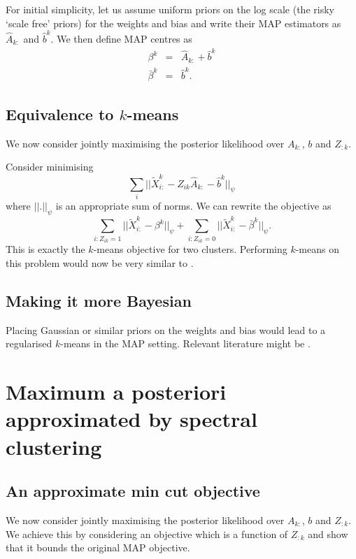 \documentclass{article}
\numberwithin{equation}{section}
\numberwithin{thm}{section}
\def\IBP{Z}
\def\Weights{A}
\def\Residuals{\tilde{X}}
\def\bias{b}
\def\centre{\beta}
\begin{document}
For initial simplicity, let us assume uniform priors on the log scale (\ie the risky `scale free' priors) for the weights and bias and write their MAP estimators as $\hat{\Weights}_{k:}$ and $\hat{\bias}^k$. We then define MAP centres as
\begin{eqnarray}
\centre^k & = & \hat{\Weights}_{k:} + \hat{\bias}^k \\
\bar{\centre}^k & = & \hat{\bias}^k.
\end{eqnarray}

\subsection{Equivalence to $k$-means}

We now consider jointly maximising the posterior likelihood over $\Weights_{k:}$, $\bias$ and $\IBP_{:k}$.

Consider minimising
\begin{equation}
\sum_i||\Residuals^k_{i:} - \IBP_{ik}\hat{\Weights}_{k:} - \hat{\bias}^k||_\psi
\end{equation}
where $||.||_\psi$ is an appropriate sum of norms. We can rewrite the objective as
\begin{equation}
\sum_{i: \IBP_{ik} = 1}||\Residuals^k_{i:} - \centre^k||_\psi + \sum_{i: \IBP_{ik} = 0}||\Residuals^k_{i:} - \bar{\centre}^k||_\psi.
\end{equation}
This is exactly the $k$-means objective for two clusters.
Performing $k$-means on this problem would now be very similar to \cite{Cui2007}.

\subsection{Making it more Bayesian}

Placing Gaussian or similar priors on the weights and bias would lead to a regularised $k$-means in the MAP setting.
Relevant literature might be \cite{Sun2012}.

\section{Maximum a posteriori approximated by spectral clustering}

\subsection{An approximate min cut objective}

We now consider jointly maximising the posterior likelihood over $\Weights_{k:}$, $\bias$ and $\IBP_{:k}$.
We achieve this by considering an objective which is a function of $\IBP_{:k}$ and show that it bounds the original MAP objective.
\end{document}
